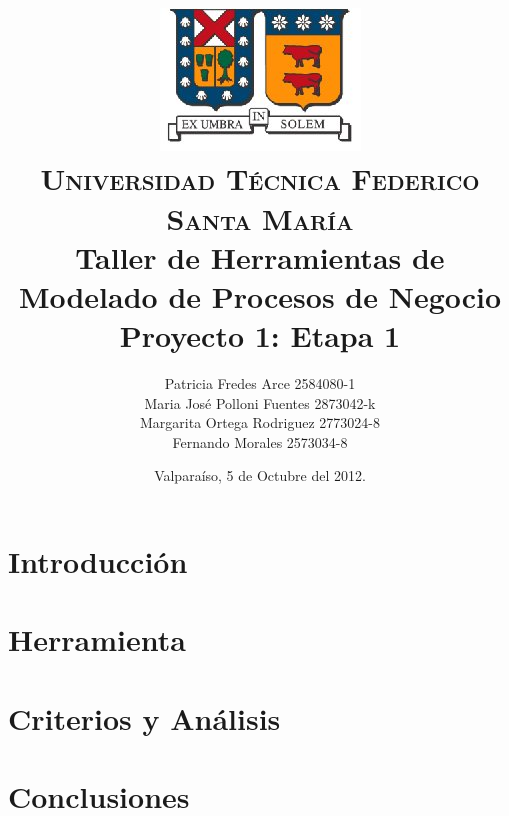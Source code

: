 \documentclass[letterpaper,12pt,spanish]{article}
\author{
{\normalsize Patricia Fredes Arce 2584080-1}\\
{\normalsize Maria José Polloni Fuentes 2873042-k}\\
{\normalsize Margarita Ortega Rodriguez 2773024-8}\\
{\normalsize Fernando Morales 2573034-8}\\
}
\title{\vspace{-1cm}\includegraphics[scale=0.5]{imagenes/logo_usm.JPG}\\\vspace{-0.2cm}
    {\small \scshape Universidad T\'ecnica Federico Santa Mar\'ia}\\
    \vspace{1cm}
    {\bfseries Taller de Herramientas de Modelado de Procesos de Negocio} \\ {\Large Proyecto 1: Etapa 1} \\\vspace{0.2cm}{\normalsize Viktor Tapia}
}
\date{Valpara\'iso, 5 de Octubre del 2012.}
\begin{document}
\maketitle
\thispagestyle{empty}
\newpage
\tableofcontents
\newpage

\section{Introducción}

\newpage
\section{Herramienta}


\section{Criterios y Análisis}


\section{Conclusiones}




 
\end{document}
